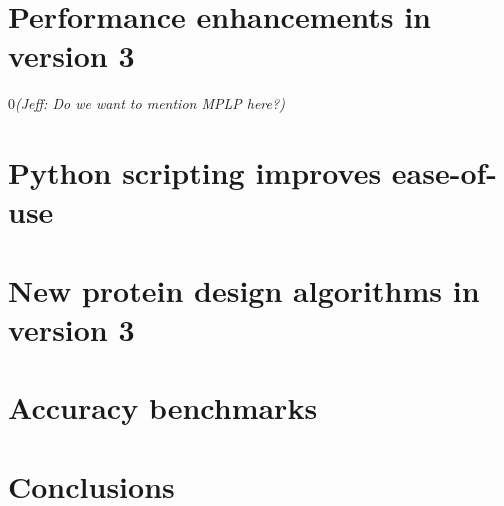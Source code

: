 \documentclass[11pt, oneside]{article}   	%
\def\submissionMode{0}
\newcommand{\jeff}[1]{\if\submissionMode0{\em\color{blue}(Jeff: #1)}\else\fi}
\newcommand{\anna}[1]{\if\submissionMode0{\em\color{purple}(Anna: #1)}\else\fi}
\begin{document}
\section{Performance enhancements in version 3}



\jeff{Do we want to mention MPLP here?}

\section{Python scripting improves ease-of-use}


\section{New protein design algorithms in version 3}




\section{Accuracy benchmarks} %


\section{Conclusions}




\end{document}
